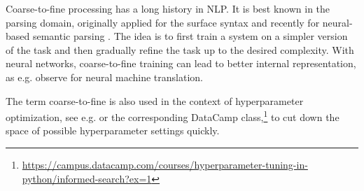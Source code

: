 Coarse-to-fine processing  has a long history in NLP. It is best known in the parsing domain, originally applied for the surface syntax  and recently for neural-based semantic parsing . The idea is to first train a system on a simpler version of the task and then gradually refine the task up to the desired complexity. With neural networks, coarse-to-fine training can lead to better internal representation, as e.g.  observe for neural machine translation.

The term coarse-to-fine is also used in the context of hyperparameter optimization, see e.g.  or the corresponding DataCamp class,\footnote{\url{https://campus.datacamp.com/courses/hyperparameter-tuning-in-python/informed-search?ex=1}} to cut down the space of possible hyperparameter settings quickly.







